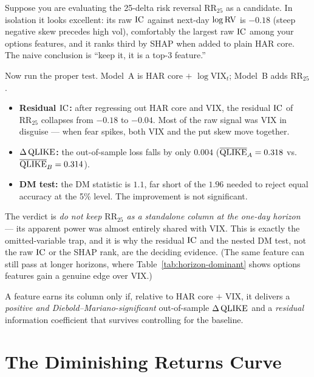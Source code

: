 \begin{workedexample}
Suppose you are evaluating the 25-delta risk reversal $\text{RR}_{25}$ as a candidate. In isolation it looks excellent: its raw $\operatorname{IC}$ against next-day $\log\operatorname{RV}$ is $-0.18$ (steep negative skew precedes high vol), comfortably the largest raw $\operatorname{IC}$ among your options features, and it ranks third by SHAP when added to plain HAR core. The naive conclusion is ``keep it, it is a top-3 feature.''

Now run the proper test. Model~A is HAR core $+$ $\log\text{VIX}_t$; Model~B adds $\text{RR}_{25}$.
\begin{itemize}[nosep]
  \item \textbf{Residual $\operatorname{IC}$:} after regressing out HAR core and VIX, the residual $\operatorname{IC}$ of $\text{RR}_{25}$ collapses from $-0.18$ to $-0.04$. Most of the raw signal was VIX in disguise --- when fear spikes, both VIX and the put skew move together.
  \item \textbf{$\Delta\operatorname{QLIKE}$:} the out-of-sample loss falls by only $0.004$ ($\overline{\operatorname{QLIKE}}_A = 0.318$ vs.\ $\overline{\operatorname{QLIKE}}_B = 0.314$).
  \item \textbf{DM test:} the DM statistic is $1.1$, far short of the $1.96$ needed to reject equal accuracy at the 5\% level. The improvement is not significant.
\end{itemize}
The verdict is \emph{do not keep $\text{RR}_{25}$ as a standalone column at the one-day horizon} --- its apparent power was almost entirely shared with VIX. This is exactly the omitted-variable trap, and it is why the residual $\operatorname{IC}$ and the nested DM test, not the raw $\operatorname{IC}$ or the SHAP rank, are the deciding evidence. (The same feature can still pass at longer horizons, where Table~\ref{tab:horizon-dominant} shows options features gain a genuine edge over VIX.)
\end{workedexample}

\begin{keyidea}
A feature earns its column only if, relative to HAR core $+$ VIX, it delivers a \emph{positive and Diebold--Mariano-significant} out-of-sample $\Delta\operatorname{QLIKE}$ and a \emph{residual} information coefficient that survives controlling for the baseline.
\end{keyidea}


\section{The Diminishing Returns Curve}\label{sec:feat-diminishing}

